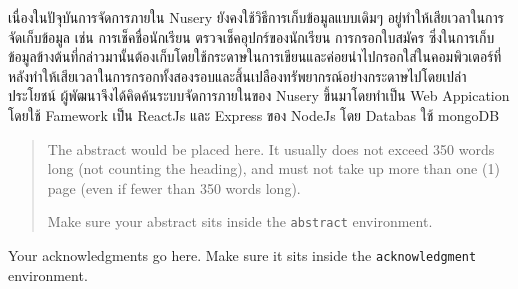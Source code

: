 \maketitle
\makesignature

\ifproject
\begin{abstractTH}
เนื่องในปัจุบันการจัดการภายใน Nusery ยังคงใช้วิธีการเก็บข้อมูลแบบเดิมๆ อยู่ทำให้เสียเวลาในการจัดเก็บข้อมูล เช่น การเช็คชื่อนักเรียน ตรวจเช็คอุปกร์ของนักเรียน การกรอกใบสมัคร ซึ่งในการเก็บข้อมูลข้างต้นที่กล่าวมานั้นต้องเก็บโดยใช้กระดาษในการเขียนและค่อยนำไปกรอกใส่ในคอมพิวเตอร์ที่หลังทำให้เสียเวลาในการกรอกทั้งสองรอบและสิ้นเปลืองทรัพยากรณ์อย่างกระดาษไปโดยเปล่าประโยชน์
\enskip 
ผู้พัฒนาจึงได้คิดค้นระบบจัดการภายในของ Nusery ขึ้นมาโดยทำเป็น  Web Appication โดยใช้ Famework เป็น ReactJs และ Express ของ NodeJs โดย Databas ใช้ mongoDB
\enskip 

\end{abstractTH}

\begin{abstract}
The abstract would be placed here. It usually does not exceed 350 words
long (not counting the heading), and must not take up more than one (1) page
(even if fewer than 350 words long).

Make sure your abstract sits inside the \texttt{abstract} environment.
\end{abstract}

\iffalse
\begin{dedication}
This document is dedicated to all Chiang Mai University students.

Dedication page is optional.
\end{dedication}
\fi %

\begin{acknowledgments}
Your acknowledgments go here. Make sure it sits inside the
\texttt{acknowledgment} environment.

\end{acknowledgments}%
\fi %

\contentspage

\ifproject
\figurelistpage

\tablelistpage
\fi %



